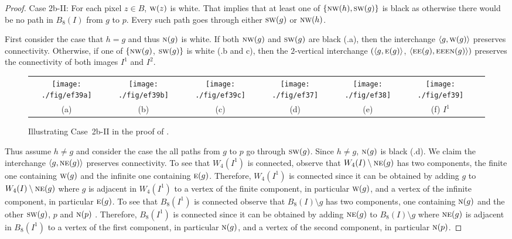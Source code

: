 \documentclass[lotsofwhite,charterfonts]{patmorin}
\newcommand{\N}{\textsc{n}}
\newcommand{\NE}{\textsc{ne}}
\newcommand{\E}{\textsc{e}}
\newcommand{\SW}{\textsc{sw}}
\newcommand{\W}{\textsc{w}}
\newcommand{\NW}{\textsc{nw}}
\newcommand{\ic}[2]{\langle #1,#2 \rangle}
\newcommand{\sm}{\ensuremath{\setminus}}
\begin{document}
\begin{proof}
\noindent Case 2b-II: For each pixel $z\in B$, $\W(z)$ is white. That implies that at least one of $\{\NW(h), \SW(g)\}$ is black as otherwise there would be no path in $B_8(I)$ from $g$ to $p$. Every such path goes through either $\SW(g)$ or $\NW(h)$.

First consider the case that  $h=g$ and thus $\N(g)$ is white. If both $\NW(g)$ and $\SW(g)$ are black (.a), then the interchange $\ic{g}{\W(g)}$ preserves connectivity. Otherwise, if one of $\{\NW(g)$, $\SW(g)\}$ is white (.b and c), then the $2$-vertical interchange $(\ic{g}{\E(g)}$, $\ic{\E\E(g)}{\E\E\E\N(g)})$ preserves the connectivity of both images $I^1$ and $I^2$.

\begin{figure}[htbp]
\begin{center}
\begin{tabular}{ccccccc}
\texttt{[image: ./fig/ef39a]} &
\texttt{[image: ./fig/ef39b]} &
\texttt{[image: ./fig/ef39c]} &
\texttt{[image: ./fig/ef37]} &
\texttt{[image: ./fig/ef38]} &
\texttt{[image: ./fig/ef39]}
\\
(a) & (b) & (c) & (d) & (e) & (f) $I^1$
\end{tabular}
\end{center}
\caption{Illustrating Case~2b-II in the proof of .}
\end{figure}


Thus assume $h\not=g$ and consider the case the all paths from  $g$ to $p$ go through $\SW(g)$. Since $h\not=g$, $\N(g)$ is black (.d). We claim the interchange $\ic{g}{\NE(g)}$ preserves connectivity. To see that $W_4(I^1)$ is connected, observe that $W_4(I)\sm \NE(g)$ has two components, the finite one containing $\W(g)$ and the infinite one containing $\E(g)$. Therefore, $W_4(I^1)$ is connected since it can be obtained by adding $g$ to $W_4(I)\sm \NE(g)$ where $g$ is adjacent in $W_4(I^1)$ to a vertex of the finite component, in particular $\W(g)$, and a vertex of the infinite component, in particular $\E(g)$. To see that $B_8(I^1)$ is connected observe that $B_8(I)\sm g$ has two components, one containing $\N(g)$ and the other $\SW(g)$, $p$ and $\N(p)$ . Therefore, $B_8(I^1)$ is connected since it can be obtained by adding $\NE(g)$ to $B_8(I)\sm g$ where $\NE(g)$ is adjacent in $B_8(I^1)$ to a vertex of the first component, in particular $\N(g)$, and a vertex of the second component, in particular $\N(p)$. 


\end{proof}
\end{document}
